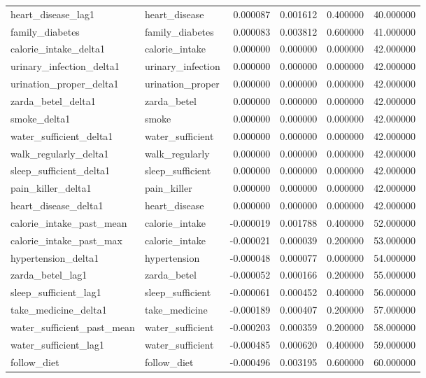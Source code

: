 \begin{longtable}{llrrrr}
heart\_disease\_lag1 & heart\_disease & 0.000087 & 0.001612 & 0.400000 & 40.000000 \\
family\_diabetes & family\_diabetes & 0.000083 & 0.003812 & 0.600000 & 41.000000 \\
calorie\_intake\_delta1 & calorie\_intake & 0.000000 & 0.000000 & 0.000000 & 42.000000 \\
urinary\_infection\_delta1 & urinary\_infection & 0.000000 & 0.000000 & 0.000000 & 42.000000 \\
urination\_proper\_delta1 & urination\_proper & 0.000000 & 0.000000 & 0.000000 & 42.000000 \\
zarda\_betel\_delta1 & zarda\_betel & 0.000000 & 0.000000 & 0.000000 & 42.000000 \\
smoke\_delta1 & smoke & 0.000000 & 0.000000 & 0.000000 & 42.000000 \\
water\_sufficient\_delta1 & water\_sufficient & 0.000000 & 0.000000 & 0.000000 & 42.000000 \\
walk\_regularly\_delta1 & walk\_regularly & 0.000000 & 0.000000 & 0.000000 & 42.000000 \\
sleep\_sufficient\_delta1 & sleep\_sufficient & 0.000000 & 0.000000 & 0.000000 & 42.000000 \\
pain\_killer\_delta1 & pain\_killer & 0.000000 & 0.000000 & 0.000000 & 42.000000 \\
heart\_disease\_delta1 & heart\_disease & 0.000000 & 0.000000 & 0.000000 & 42.000000 \\
calorie\_intake\_past\_mean & calorie\_intake & -0.000019 & 0.001788 & 0.400000 & 52.000000 \\
calorie\_intake\_past\_max & calorie\_intake & -0.000021 & 0.000039 & 0.200000 & 53.000000 \\
hypertension\_delta1 & hypertension & -0.000048 & 0.000077 & 0.000000 & 54.000000 \\
zarda\_betel\_lag1 & zarda\_betel & -0.000052 & 0.000166 & 0.200000 & 55.000000 \\
sleep\_sufficient\_lag1 & sleep\_sufficient & -0.000061 & 0.000452 & 0.400000 & 56.000000 \\
take\_medicine\_delta1 & take\_medicine & -0.000189 & 0.000407 & 0.200000 & 57.000000 \\
water\_sufficient\_past\_mean & water\_sufficient & -0.000203 & 0.000359 & 0.200000 & 58.000000 \\
water\_sufficient\_lag1 & water\_sufficient & -0.000485 & 0.000620 & 0.400000 & 59.000000 \\
follow\_diet & follow\_diet & -0.000496 & 0.003195 & 0.600000 & 60.000000 \\

\end{longtable}
